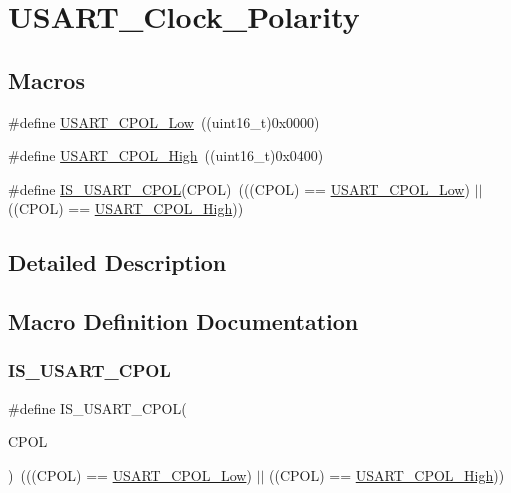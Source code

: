 \hypertarget{group___u_s_a_r_t___clock___polarity}{}\section{U\+S\+A\+R\+T\+\_\+\+Clock\+\_\+\+Polarity}
\label{group___u_s_a_r_t___clock___polarity}
\subsection*{Macros}
\begin{DoxyCompactItemize}
\item 
\#define \mbox{\hyperlink{group___u_s_a_r_t___clock___polarity_ga194d60b47d8042d39e843c52f3a6aa1a}{U\+S\+A\+R\+T\+\_\+\+C\+P\+O\+L\+\_\+\+Low}}~((uint16\+\_\+t)0x0000)
\item 
\#define \mbox{\hyperlink{group___u_s_a_r_t___clock___polarity_ga4ba6946dd9f0b4fd38115f24798c210f}{U\+S\+A\+R\+T\+\_\+\+C\+P\+O\+L\+\_\+\+High}}~((uint16\+\_\+t)0x0400)
\item 
\#define \mbox{\hyperlink{group___u_s_a_r_t___clock___polarity_ga833e9d2e85ab84658c7a7c18bd0bc8b9}{I\+S\+\_\+\+U\+S\+A\+R\+T\+\_\+\+C\+P\+OL}}(C\+P\+OL)~(((C\+P\+OL) == \mbox{\hyperlink{group___u_s_a_r_t___clock___polarity_ga194d60b47d8042d39e843c52f3a6aa1a}{U\+S\+A\+R\+T\+\_\+\+C\+P\+O\+L\+\_\+\+Low}}) $\vert$$\vert$ ((C\+P\+OL) == \mbox{\hyperlink{group___u_s_a_r_t___clock___polarity_ga4ba6946dd9f0b4fd38115f24798c210f}{U\+S\+A\+R\+T\+\_\+\+C\+P\+O\+L\+\_\+\+High}}))
\end{DoxyCompactItemize}


\subsection{Detailed Description}


\subsection{Macro Definition Documentation}
\mbox{\label{group___u_s_a_r_t___clock___polarity_ga833e9d2e85ab84658c7a7c18bd0bc8b9}} 
\subsubsection{\texorpdfstring{IS\_USART\_CPOL}{IS\_USART\_CPOL}}
{\footnotesize\ttfamily \#define I\+S\+\_\+\+U\+S\+A\+R\+T\+\_\+\+C\+P\+OL(\begin{DoxyParamCaption}\item[{}]{C\+P\+OL }\end{DoxyParamCaption})~(((C\+P\+OL) == \mbox{\hyperlink{group___u_s_a_r_t___clock___polarity_ga194d60b47d8042d39e843c52f3a6aa1a}{U\+S\+A\+R\+T\+\_\+\+C\+P\+O\+L\+\_\+\+Low}}) $\vert$$\vert$ ((C\+P\+OL) == \mbox{\hyperlink{group___u_s_a_r_t___clock___polarity_ga4ba6946dd9f0b4fd38115f24798c210f}{U\+S\+A\+R\+T\+\_\+\+C\+P\+O\+L\+\_\+\+High}}))}


